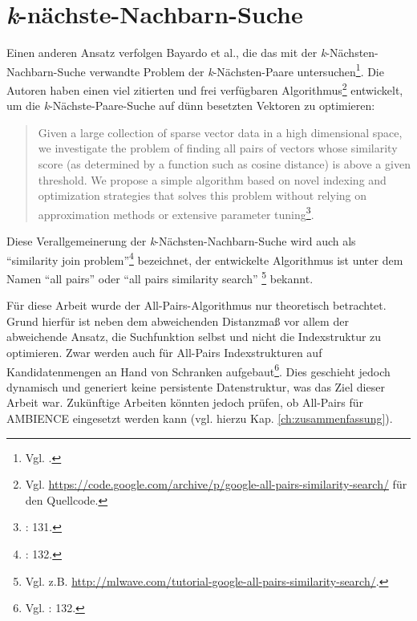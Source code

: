 \section{\textit{k}-nächste-Nachbarn-Suche}\label{sec:bloom-knn}
Einen anderen Ansatz verfolgen Bayardo et al., die das mit der \textit{k}-Nächsten-Nachbarn-Suche verwandte Problem der \textit{k}-Nächsten-Paare untersuchen\footnote{Vgl. \cite{Bayardo2007}.}. Die Autoren haben einen viel zitierten und frei verfügbaren Algorithmus\footnote{Vgl. \url{https://code.google.com/archive/p/google-all-pairs-similarity-search/} für den Quell\-code.} entwickelt, um die \textit{k}-Nächste-Paare-Suche auf dünn besetzten Vektoren zu optimieren: 
\begin{quote}
Given a large collection of sparse vector data in a high dimensional space, we investigate the problem of finding all pairs of vectors whose similarity score (as determined by a function such as cosine distance) is above a given threshold. We propose a simple algorithm based on novel indexing and optimization strategies that solves this problem without relying on approximation methods or extensive parameter tuning\footnote{\cite{Bayardo2007}: 131.}. 
\end{quote}
Diese Verallgemeinerung der \textit{k}-Nächsten-Nachbarn-Suche wird auch als "`similarity join problem"'\footnote{\cite{Bayardo2007}: 132.} bezeichnet, der entwickelte Algorithmus ist unter dem Namen "`all pairs"' oder "`all pairs similarity search"' \footnote{Vgl. z.B. \url{http://mlwave.com/tutorial-google-all-pairs-similarity-search/}.} bekannt. 

Für diese Arbeit wurde der All-Pairs-Algorithmus nur theoretisch betrachtet. Grund hierfür ist neben dem abweichenden Distanzmaß vor allem der abweichende Ansatz, die Suchfunktion selbst und nicht die Indexstruktur zu optimieren. Zwar werden auch für All-Pairs Indexstrukturen auf Kandidatenmengen an Hand von Schranken aufgebaut\footnote{Vgl. \cite{Bayardo2007}: 132.}. Dies geschieht jedoch dynamisch und generiert keine persistente Datenstruktur, was das Ziel dieser Arbeit war. Zukünftige Arbeiten könnten jedoch prüfen, ob All-Pairs für AMBIENCE eingesetzt werden kann (vgl. hierzu Kap. \ref{ch:zusammenfassung}). 